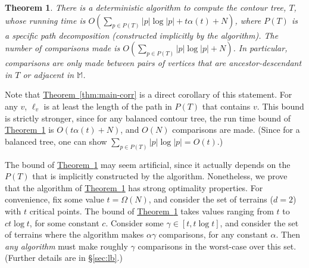 \documentclass[11pt]{article}
\newtheorem{theorem}{Theorem}[section]
\theoremstyle{definition}
\newcommand{\MM}{\mathbb{M}}
\newcommand{\Sec}[1]{\hyperref[sec:#1]{\S\ref*{sec:#1}}} %
\newcommand{\Thm}[1]{\hyperref[thm:#1]{Theorem~\ref*{thm:#1}}} %
\newcommand{\thmConst}{\gamma}
\begin{document}
\begin{theorem} 
\label{thm:main-alg} 
There is a deterministic algorithm to compute the contour tree, $T$, whose running time is $O(\sum_{p \in P(T)} |p|\log |p| + t\alpha(t) + N)$,
where $P(T)$ is a specific path decomposition (constructed implicitly by the algorithm).
The number of comparisons made is $O(\sum_{p \in P(T)} |p|\log |p| + N)$.
In particular, comparisons are only made between pairs of vertices that are ancestor-descendant in $T$ or adjacent in $\MM$.
\end{theorem}

Note that \Thm{main-corr} is a direct corollary of this statement. For any $v$, $\ell_v$ is at least
the length of the path in $P(T)$ that contains $v$.
This bound is strictly stronger,
since for any balanced contour tree, the run time bound of \Thm{main-alg} is $O(t\alpha(t) + N)$, and $O(N)$
comparisons are made. (Since for a balanced tree, one can show $\sum_{p \in P(T)} |p|\log |p|= O(t)$.)

The bound of \Thm{main-alg} may seem artificial, since it actually depends on the $P(T)$ that
is implicitly constructed by the algorithm. Nonetheless, we prove that the algorithm of \Thm{main-alg}
has strong optimality properties. For convenience, fix some value $t=\Omega(N)$, and consider the set
of terrains ($d=2$) with $t$ critical points. The bound of \Thm{main-alg} takes values ranging
from $t$ to $c t\log t$, for some constant $c$. Consider some $\thmConst \in [t,t\log t]$, and consider the set of terrains
where the algorithm makes $\alpha \thmConst$ comparisons, for any constant $\alpha$. Then \emph{any algorithm} must make roughly $\thmConst$
comparisons in the worst-case over this set. (Further details are in \Sec{lb}.)
\end{document}

